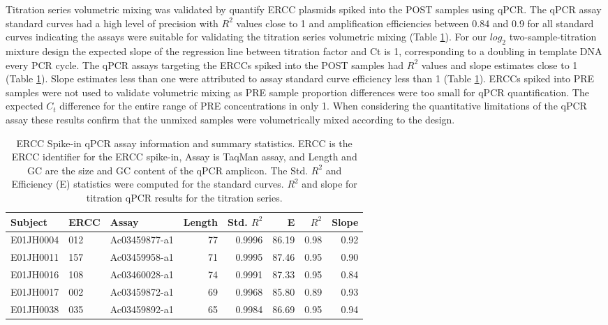 \documentclass[smallextended]{svjour3}       %
\begin{document}
Titration series volumetric mixing was validated by quantify ERCC
plasmids spiked into the POST samples using qPCR. The qPCR assay
standard curves had a high level of precision with \(R^2\) values close
to 1 and amplification efficiencies between 0.84 and 0.9 for all
standard curves indicating the assays were suitable for validating the
titration series volumetric mixing (Table \ref{tab:erccTable}). For our
\(log_2\) two-sample-titration mixture design the expected slope of the
regression line between titration factor and Ct is 1, corresponding to a
doubling in template DNA every PCR cycle. The qPCR assays targeting the
ERCCs spiked into the POST samples had \(R^2\) values and slope
estimates close to 1 (Table \ref{tab:erccTable}). Slope estimates less
than one were attributed to assay standard curve efficiency less than 1
(Table \ref{tab:erccTable}). ERCCs spiked into PRE samples were not used
to validate volumetric mixing as PRE sample proportion differences were
too small for qPCR quantification. The expected \(C_t\) difference for
the entire range of PRE concentrations in only 1. When considering the
quantitative limitations of the qPCR assay these results confirm that
the unmixed samples were volumetrically mixed according to the design.

\begin{table}

\caption{\label{tab:erccTable}ERCC Spike-in qPCR assay information and summary statistics. ERCC is the ERCC identifier for the ERCC spike-in, Assay is TaqMan assay, and Length and GC are the size and GC content of the qPCR amplicon.  The Std. $R^2$ and Efficiency (E) statistics were computed for the standard curves. $R^2$ and slope for titration qPCR results for the titration series.}
\centering
\begin{tabular}[t]{lllrrrrr}
\toprule
Subject & ERCC & Assay & Length & Std. $R^2$ & E & $R^2$ & Slope\\
\midrule
E01JH0004 & 012 & Ac03459877-a1 & 77 & 0.9996 & 86.19 & 0.98 & 0.92\\
E01JH0011 & 157 & Ac03459958-a1 & 71 & 0.9995 & 87.46 & 0.95 & 0.90\\
E01JH0016 & 108 & Ac03460028-a1 & 74 & 0.9991 & 87.33 & 0.95 & 0.84\\
E01JH0017 & 002 & Ac03459872-a1 & 69 & 0.9968 & 85.80 & 0.89 & 0.93\\
E01JH0038 & 035 & Ac03459892-a1 & 65 & 0.9984 & 86.69 & 0.95 & 0.94\\
\bottomrule
\end{tabular}
\end{table}
\end{document}
